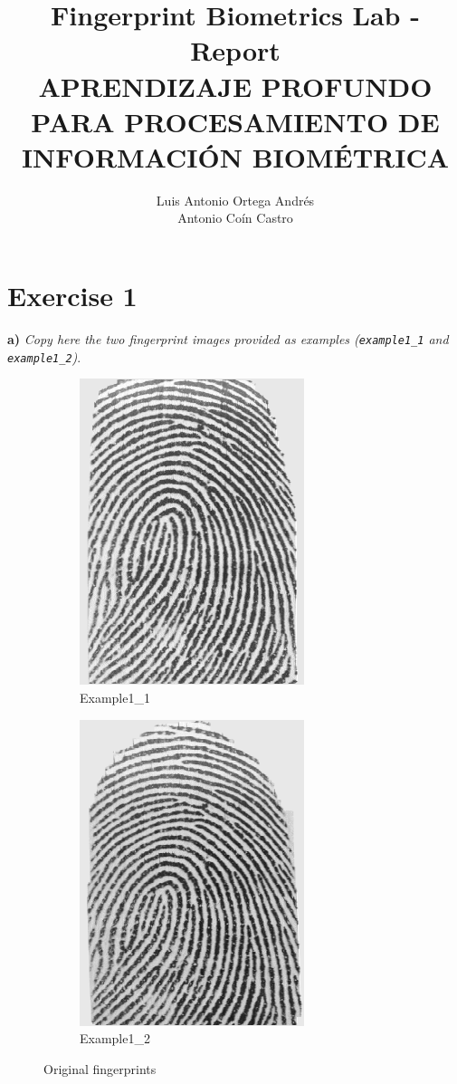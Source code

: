 \documentclass[11pt]{article}
\author{Luis Antonio Ortega Andrés\\Antonio Coín Castro}
\date{}
\title{Fingerprint Biometrics Lab - Report\\\medskip
\large APRENDIZAJE PROFUNDO PARA PROCESAMIENTO DE INFORMACIÓN BIOMÉTRICA}
\begin{document}
\maketitle

\section*{Exercise 1}
\textbf{a) } \emph{Copy here the two fingerprint images provided as examples (\texttt{example1\_1} and \texttt{example1\_2})}.

\begin{figure}[h!]
  \centering
       \begin{subfigure}[t]{0.45\textwidth}
         \centering
         \includegraphics[scale=1.0]{img/example1_1}
         \caption{Example1\_1}
     \end{subfigure}%
     \quad
     \begin{subfigure}[t]{0.45\textwidth}
         \centering
         \includegraphics[scale=1.0]{img/example1_2.png}
         \caption{Example1\_2}
     \end{subfigure}
    \caption{Original fingerprints}
\end{figure}
\end{document}
